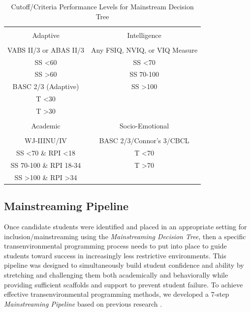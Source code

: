\documentclass[twoside]{article}
\begin{document}
%
%
%
%
%
%
%
%
\begin{table}[tbp]
\centering
\caption{Cutoff/Criteria Performance Levels for Mainstream Decision Tree}
\label{tab3}
\begin{tabular}{cc}
\hline \\
Adaptive & Intelligence\\
\hline \\
VABS II/3 or ABAS II/3 & Any FSIQ, NVIQ, or VIQ Measure\\
SS \textless60 & SS \textless70\\
SS \textgreater60 & SS 70-100\\
BASC 2/3 (Adaptive) & SS \textgreater100\\
T \textless30 & \\
T \textgreater30 & \\
\hline \\
Academic & Socio-Emotional\\
\hline \\
WJ-IIINU/IV & BASC 2/3/Connor's 3/CBCL\\
SS \textless70 \& RPI \textless18 & T \textless70\\
SS 70-100 \& RPI 18-34 & T \textgreater70\\
SS \textgreater100 \& RPI \textgreater34 &\\
\hline
\end{tabular}
\end{table}
%
%
%
%
%
%
%
%
\subsection{Mainstreaming Pipeline}
Once candidate students were identified and placed in an appropriate setting for inclusion/mainstreaming using the \textit{Mainstreaming Decision Tree}, then a specific transenvironmental programming process needs to put into place to guide students toward success in increasingly less restrictive environments. This pipeline was designed to simultaneously build student confidence and ability by stretching and challenging them both academically and behaviorally while providing sufficient scaffolds and support to prevent student failure. To achieve effective transenvironmental programming methods, we developed a 7-step \textit{Mainstreaming Pipeline} based on previous research \parencite{fuchs1993conservative,fuchs1994classroom,marden2013criteria,mathes1998preparing,wadsworth1999preparing,wadsworth1999preparing}. 
\end{document}
